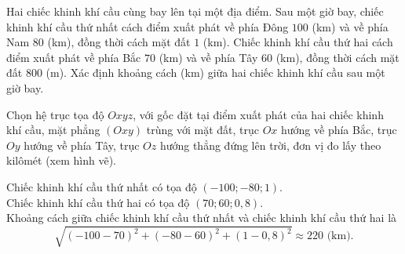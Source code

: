 \begin{bt}%

	Hai chiếc khinh khí cầu cùng bay lên tại một địa điểm. Sau một giờ bay, chiếc khinh khí cầu thứ nhất cách điểm xuất phát về phía Đông $100$ (km) và về phía Nam $80$ (km), đồng thời cách mặt đất $1$ (km). Chiếc khinh khí cầu thứ hai cách điểm xuất phát về phía Bắc $70$ (km) và về phía Tây $60$ (km), đồng thời cách mặt đất $800$ (m). Xác định khoảng cách (km) giữa hai chiếc khinh khí cầu sau một giờ bay. 
	\loigiai
	{
		Chọn hệ trục tọa độ $O x y z$, với gốc đặt tại điểm xuất phát của hai chiếc khinh khí cầu, mặt phẳng $(O x y)$ trùng với mặt đất, trục $O x$ hướng về phía Bắc, trục $O y$ hướng về phía Tây, trục $O z$ hướng thẳng đứng lên trời, đơn vị đo lấy theo kilômét (xem hình vẽ).\\
		\begin{center}
		\end{center}
		Chiếc khinh khí cầu thứ nhất có tọa độ $(-100;-80; 1)$.\\
		Chiếc khinh khí cầu thứ hai có tọa độ $(70; 60; 0{,}8)$.\\
		Khoảng cách giữa chiếc khinh khí cầu thứ nhất và chiếc khinh khí cầu thứ hai là
		$$\sqrt{(-100-70)^2+(-80-60)^2+(1-0{,}8)^2} \approx 220 \text{ (km)}.$$ 	
	}
\end{bt}

